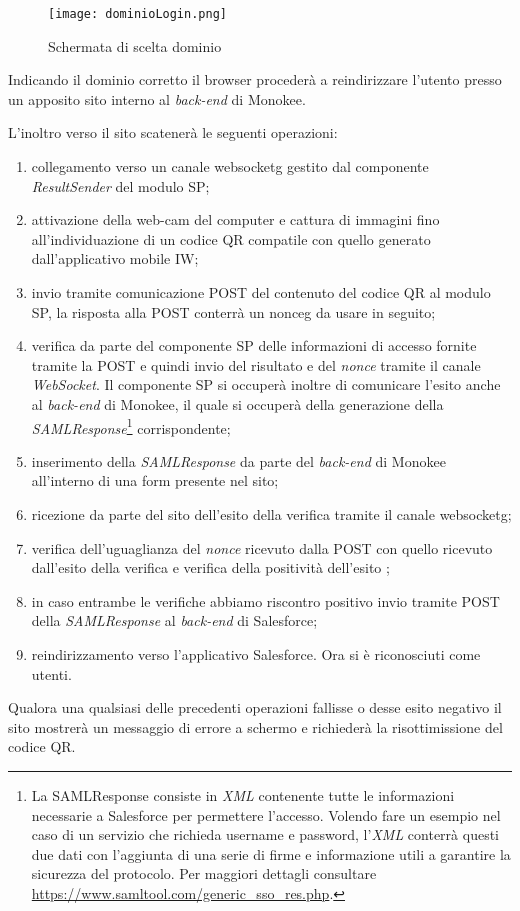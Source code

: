 \begin{figure}[!h]
    
    \centering
    \texttt{[image: dominioLogin.png]} 
    \caption{Schermata di scelta dominio}
    \label{fig:salesforce-dom} 
\end{figure}

Indicando il dominio corretto il browser procederà a reindirizzare l'utento presso un apposito sito interno al \emph{back-end} di Monokee.

L'inoltro verso il sito scatenerà le seguenti operazioni:
\begin{enumerate}
    \item collegamento verso un canale \gls{websocketg} gestito dal componente \emph{ResultSender} del modulo SP;
    \item attivazione della web-cam del computer e cattura di immagini fino all'individuazione di un codice QR compatile con quello generato dall'applicativo mobile IW;
    \item invio tramite comunicazione POST del contenuto del codice QR al modulo SP, la risposta alla POST conterrà un \gls{nonceg} da usare in seguito;
    \item verifica da parte del componente SP delle informazioni di accesso fornite tramite la POST e quindi invio del risultato e del \emph{nonce} tramite il canale \emph{WebSocket}. Il componente SP si occuperà inoltre di comunicare l'esito anche al \emph{back-end} di Monokee, il quale si occuperà della generazione della \emph{SAMLResponse}\footnote{La SAMLResponse consiste in \emph{XML} contenente tutte le informazioni necessarie a Salesforce per permettere l'accesso. Volendo fare un esempio nel caso di un servizio che richieda username e password, l'\emph{XML} conterrà questi due dati con l'aggiunta di una serie di firme e informazione utili a garantire la sicurezza del protocolo. Per maggiori dettagli consultare \url{https://www.samltool.com/generic_sso_res.php}.} corrispondente;
    \item inserimento della \emph{SAMLResponse} da parte del \emph{back-end} di Monokee all'interno di una form presente nel sito;
    \item ricezione da parte del sito dell'esito della verifica tramite il canale \gls{websocketg};
    \item verifica dell'uguaglianza del \emph{nonce} ricevuto dalla POST con quello ricevuto dall'esito della verifica e verifica della positività dell'esito ;
    \item in caso entrambe le verifiche abbiamo riscontro positivo invio tramite POST della \emph{SAMLResponse} al \emph{back-end} di Salesforce;
    \item reindirizzamento verso l'applicativo Salesforce. Ora si è riconosciuti come utenti.
\end{enumerate}

\noindent Qualora una qualsiasi delle precedenti operazioni fallisse o desse esito negativo il sito mostrerà un messaggio di errore a schermo e richiederà la risottimissione del codice QR.
